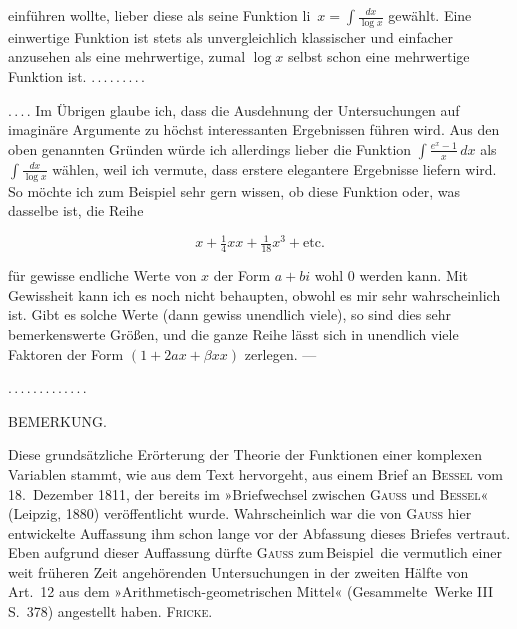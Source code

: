 %
einführen wollte, lieber diese als seine Funktion li~$x = \int \frac{dx}{\log x}$ gewählt. Eine
einwertige Funktion ist stets als unvergleichlich klassischer und einfacher anzusehen als
eine mehrwertige, zumal $\log x$ selbst schon eine mehrwertige Funktion ist. $\mathord{.}\,\mathord{.}\,\mathord{.}\,\mathord{.}\,\mathord{.}\,\mathord{.}\,\mathord{.}\,\mathord{.}\,\mathord{.}$

$\mathord{.}\,\mathord{.}\,\mathord{.}\,\mathord{.}$ Im Übrigen glaube ich, dass die Ausdehnung der Untersuchungen auf imaginäre
Argumente zu höchst interessanten Ergebnissen führen wird. Aus den
oben genannten Gründen würde ich allerdings lieber die Funktion $\int \frac{e^x-1}{x}\,dx$ als
$\int \frac{dx}{\log x}$ wählen, weil ich vermute, dass erstere elegantere Ergebnisse liefern
wird. So möchte ich zum Beispiel sehr gern wissen, ob diese Funktion oder, was dasselbe ist,
die Reihe

\[
x + \tfrac14 xx + \tfrac{1}{18}x^3 + \text{etc.}
\]

\noindent für gewisse endliche Werte von $x$ der Form $a+bi$ wohl $0$ werden kann. Mit
Gewissheit kann ich es noch nicht behaupten, obwohl es mir sehr wahrscheinlich ist. Gibt es
solche Werte (dann gewiss unendlich viele), so sind dies sehr bemerkenswerte Größen,
und die ganze Reihe lässt sich in unendlich viele Faktoren der Form $(1+2ax+\beta xx)$ zerlegen.
---

$\mathord{.}\,\mathord{.}\,\mathord{.}\,\mathord{.}\,\mathord{.}\,\mathord{.}\,\mathord{.}\,\mathord{.}\,\mathord{.}\,\mathord{.}\,\mathord{.}\,\mathord{.}\,\mathord{.}$

\begin{center}
BEMERKUNG.
\end{center}

\noindent\hspace*{\parindent}Diese grundsätzliche Erörterung der Theorie der Funktionen einer komplexen Variablen
stammt, wie aus dem Text hervorgeht, aus einem Brief an \textsc{Bessel} vom 18.\ Dezember 1811,
der bereits im »Briefwechsel zwischen \textsc{Gauss} und \textsc{Bessel}«
(Leipzig, 1880) veröffentlicht wurde. Wahrscheinlich war die von
\textsc{Gauss} hier entwickelte Auffassung ihm schon lange vor der Abfassung dieses
Briefes vertraut. Eben aufgrund dieser Auffassung dürfte \textsc{Gauss} zum\,Beispiel\ die
vermutlich einer weit früheren Zeit angehörenden Untersuchungen in der zweiten Hälfte
von Art.\ 12 aus dem »Arithmetisch-geometrischen Mittel« (Gesammelte\ Werke III S.\ 378) angestellt
haben. \hfill \textsc{Fricke}.
